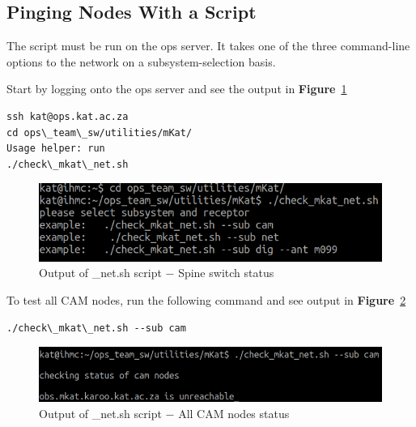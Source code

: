 \subsection{ Pinging Nodes With a Script}
The script must be run on the ops server. It takes one of the three command-line options to the network on a subsystem-selection basis.

Start by logging onto the ops server and see the output in \textbf{Figure}~\ref{fig:image127}
\begin{lstlisting}[style=DOS]
ssh kat@ops.kat.ac.za
cd ops\_team\_sw/utilities/mKat/
Usage helper: run 
./check\_mkat\_net.sh

\end{lstlisting}


\begin{figure}[!thb]
	\centering
	\includegraphics[scale=0.63]{Chapters/images/image127.png}
	
	\caption{Output of \_net.sh script $-$ Spine switch status}
	\label{fig:image127}
\end{figure}


To test all CAM nodes, run the following command and see output in \textbf{Figure}~\ref{fig:image55}
\begin{lstlisting}[style=DOS]
./check\_mkat\_net.sh --sub cam

\end{lstlisting}




\begin{figure}[!thb]
	\centering
	\includegraphics[scale=0.55]{Chapters/images/image55.png}
	
	\caption{Output of \_net.sh script $-$ All CAM nodes status}
	\label{fig:image55}
\end{figure}


